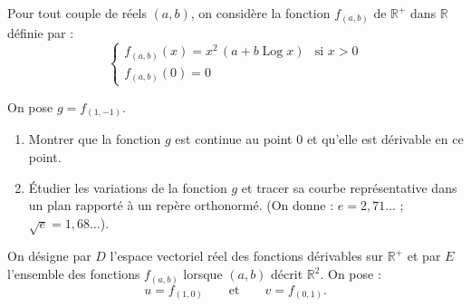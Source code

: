 \documentclass{axiobac}
\begin{document}
\begin{probleme}{}

Pour tout couple de réels $(a, b)$, on considère la fonction $f_{(a,b)}$ de $\mathbb{R}^+$ dans $\mathbb{R}$ définie par :
\[
\begin{cases}
    f_{(a,b)}(x) = x^2\,(a + b \operatorname{Log} x) & \text{si } x > 0 \\
    f_{(a,b)}(0) = 0
\end{cases}
\]


On pose $g = f_{(1,-1)}$.

\begin{enumerate}
    \item Montrer que la fonction $g$ est continue au point $0$ et qu'elle est dérivable en ce point.
    \item Étudier les variations de la fonction $g$ et tracer sa courbe représentative dans un plan rapporté à un repère orthonormé. (On donne : $e = 2{,}71\ldots$ ; $\sqrt{e} = 1{,}68\ldots$).
\end{enumerate}

\horsprogramme

On désigne par $D$ l'espace vectoriel réel des fonctions dérivables sur $\mathbb{R}^+$ et par $E$ l'ensemble des fonctions $f_{(a,b)}$ lorsque $(a, b)$ décrit $\mathbb{R}^2$. On pose :
\[
u = f_{(1,0)} \qquad \text{et} \qquad v = f_{(0,1)} .
\]


\end{probleme}
\end{document}
